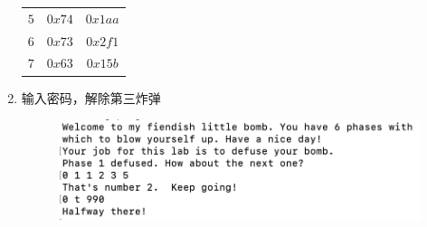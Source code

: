 \begin{enumerate}
\begin{table}[htbp]
\begin{tabular}{c|c|c}
                        $5$ & $0x74$ & $0x1aa$ \\
                        $6$ & $0x73$ & $0x2f1$ \\
                        $7$ & $0x63$ & $0x15b$ \\
                    \end{tabular}
                \end{table}
            \item 输入密码，解除第三炸弹
                \begin{figure}[htbp]
                    \centering
                    \includegraphics*[width = 12cm]{s3_7.png}
                \end{figure}
        \end{enumerate}
    \newpage
